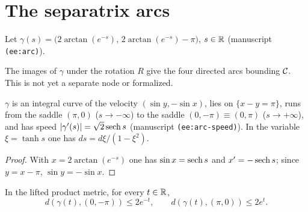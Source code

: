 \section{The separatrix arcs}

\begin{definition}
\label{def:separatrix-arc}
\leanok
Let $\gamma(s)=\big(2\arctan(e^{-s}),\,2\arctan(e^{-s})-\pi\big)$, $s\in\mathbb{R}$
(manuscript \texttt{(ee:arc)}).
\end{definition}

\begin{remark}
The images of $\gamma$ under the rotation $R$ give the four directed arcs
bounding $\mathcal{C}$. This is not yet a separate node or formalized.
\end{remark}

\begin{lemma}
\label{lem:separatrix-arc}
\leanok
$\gamma$ is an integral curve of the velocity $(\sin y,-\sin x)$, lies on
$\{x-y=\pi\}$, runs from the saddle $(\pi,0)$ ($s\to-\infty$) to the saddle
$(0,-\pi)\equiv(0,\pi)$ ($s\to+\infty$), and has speed
$|\gamma'(s)|=\sqrt2\operatorname{sech} s$ (manuscript \texttt{(ee:arc-speed)}). In the
variable $\xi=\tanh s$ one has $ds=d\xi/(1-\xi^2)$.
\end{lemma}

\begin{proof}
\leanok
With $x=2\arctan(e^{-s})$ one has $\sin x=\operatorname{sech} s$ and $x'=-\operatorname{sech} s$; since
$y=x-\pi$, $\sin y=-\sin x$.
\end{proof}

\begin{lemma}
\label{lem:arc-endpoint-distance}
\leanok
In the lifted product metric, for every $t\in\mathbb{R}$,
\[
 d(\gamma(t),(0,-\pi))\le2e^{-t},\qquad
 d(\gamma(t),(\pi,0))\le2e^t.
\]
\end{lemma}

